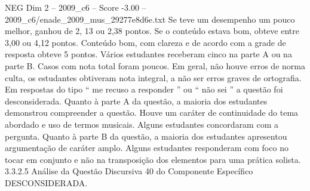 \begin{textsample}{NEG Dim 2 – 2009\_c6 – Score -3.00 – 2009\_c6/enade\_2009\_mus\_29277e8d6e.txt}
Se teve um desempenho um pouco melhor, ganhou de 2, 13 ou 2,38 pontos.
Se o conteúdo estava bom, obteve entre 3,00 ou 4,12 pontos.
Conteúdo bom, com clareza e de acordo com a grade de resposta obteve 5 pontos.
Vários estudantes receberam cinco na parte A ou na parte B.
Casos com nota total foram poucos.
Em geral, não houve erros de norma culta, os estudantes obtiveram nota integral, a não ser erros graves de ortografia.
Em respostas do tipo “ me recuso a responder ” ou “ não sei ” a questão foi desconsiderada.
Quanto à parte A da questão, a maioria dos estudantes demonstrou compreender a questão.
Houve um caráter de continuidade do tema abordado e uso de termos musicais.
Alguns estudantes concordaram com a pergunta.
Quanto à parte B da questão, a maioria dos estudantes apresentou argumentação de caráter amplo.
Alguns estudantes responderam com foco no tocar em conjunto e não na transposição dos elementos para uma prática solista. 3.3.2.5 Análise da Questão Discursiva 40 do Componente Específico DESCONSIDERADA.

\end{textsample}
